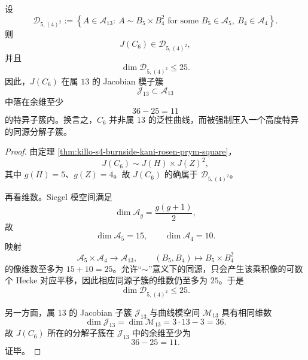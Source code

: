 \begin{conclusion}\label{con:xi-time-part9n-c6-special-jacobian-locus}
设
\[
\mathcal D_{5,(4)^2}
:=
\left\{
A\in \mathcal A_{13}:\ 
A\sim B_5\times B_4^2
\text{ for some }B_5\in\mathcal A_5,\ B_4\in\mathcal A_4
\right\}.
\]
则
\[
J(C_6)\in \mathcal D_{5,(4)^2},
\]
并且
\[
\dim \mathcal D_{5,(4)^2}\le 25.
\]
因此，\(J(C_6)\) 在属 \(13\) 的 Jacobian 模子簇
\[
\mathcal J_{13}\subset \mathcal A_{13}
\]
中落在余维至少
\[
\boxed{\;36-25=11\;}
\]
的特异子簇内。换言之，\(C_6\) 并非属 \(13\) 的泛性曲线，而被强制压入一个高度特异的同源分解子簇。
\end{conclusion}
\begin{proof}
由定理 \ref{thm:killo-s4-burnside-kani-rosen-prym-square}，
\[
J(C_6)\sim J(H)\times J(Z)^2,
\]
其中 \(g(H)=5\)、\(g(Z)=4\)。故 \(J(C_6)\) 的确属于 \(\mathcal D_{5,(4)^2}\)。

再看维数。Siegel 模空间满足
\[
\dim \mathcal A_g=\frac{g(g+1)}{2},
\]
故
\[
\dim \mathcal A_5=15,\qquad \dim \mathcal A_4=10.
\]
映射
\[
\mathcal A_5\times \mathcal A_4\longrightarrow \mathcal A_{13},
\qquad
(B_5,B_4)\longmapsto B_5\times B_4^2
\]
的像维数至多为 \(15+10=25\)。允许“\(\sim\)”意义下的同源，只会产生该乘积像的可数个 Hecke 对应平移，因此相应同源子簇的维数仍至多为 \(25\)。于是
\[
\dim \mathcal D_{5,(4)^2}\le 25.
\]

另一方面，属 \(13\) 的 Jacobian 子簇 \(\mathcal J_{13}\) 与曲线模空间 \(\mathcal M_{13}\) 具有相同维数
\[
\dim \mathcal J_{13}=\dim \mathcal M_{13}=3\cdot 13-3=36.
\]
故 \(J(C_6)\) 所在的分解子簇在 \(\mathcal J_{13}\) 中的余维至少为
\[
36-25=11.
\]
证毕。
\end{proof}
